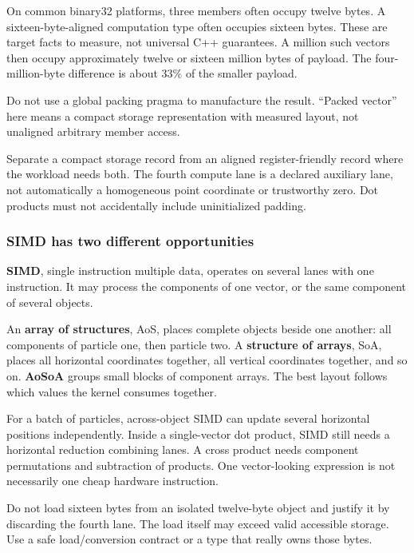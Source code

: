 On common binary32 platforms, three  members often occupy twelve bytes. A sixteen-byte-aligned computation type often occupies sixteen bytes. These are target facts to measure, not universal C++ guarantees. A million such vectors then occupy approximately twelve or sixteen million bytes of payload. The four-million-byte difference is about \(33\%\) of the smaller payload.

Do not use a global packing pragma to manufacture the result. ``Packed vector'' here means a compact storage representation with measured layout, not unaligned arbitrary member access.

Separate a compact storage record from an aligned register-friendly record where the workload needs both. The fourth compute lane is a declared auxiliary lane, not automatically a homogeneous point coordinate or trustworthy zero. Dot products must not accidentally include uninitialized padding.

\subsubsection{SIMD has two different opportunities}\label{02-foundations-ii-ch037-simd-has-two-different-opportunities}

\hypertarget{02-foundations-ii-ch037-simd-has-two-different-opportunities}{}

\textbf{SIMD}, single instruction multiple data, operates on several lanes with one instruction. It may process the components of one vector, or the same component of several objects.

An \textbf{array of structures}, AoS, places complete objects beside one another: all components of particle one, then particle two. A \textbf{structure of arrays}, SoA, places all horizontal coordinates together, all vertical coordinates together, and so on. \textbf{AoSoA} groups small blocks of component arrays. The best layout follows which values the kernel consumes together.

For a batch of particles, across-object SIMD can update several horizontal positions independently. Inside a single-vector dot product, SIMD still needs a horizontal reduction combining lanes. A cross product needs component permutations and subtraction of products. One vector-looking expression is not necessarily one cheap hardware instruction.

Do not load sixteen bytes from an isolated twelve-byte object and justify it by discarding the fourth lane. The load itself may exceed valid accessible storage. Use a safe load/conversion contract or a type that really owns those bytes.

